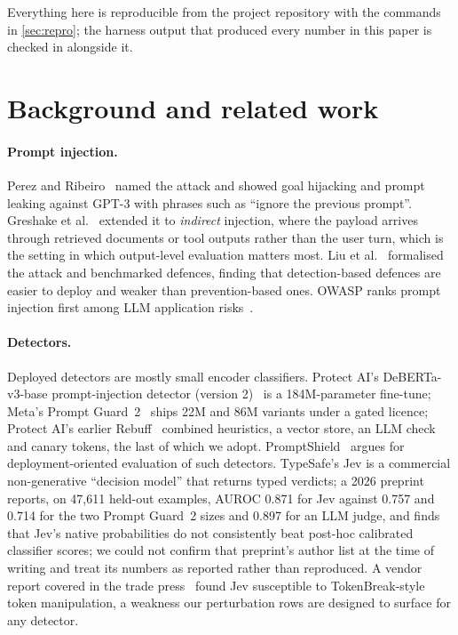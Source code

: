 \documentclass[10pt,a4paper]{article}
\begin{document}
Everything here is reproducible from the project repository with the commands in \cref{sec:repro}; the harness output that produced every number in this paper is checked in alongside it.

\section{Background and related work}
\label{sec:related}

\paragraph{Prompt injection.} Perez and Ribeiro~\cite{perez2022ignore} named the attack and showed goal hijacking and prompt leaking against GPT-3 with phrases such as ``ignore the previous prompt''. Greshake et al.~\cite{greshake2023indirect} extended it to \emph{indirect} injection, where the payload arrives through retrieved documents or tool outputs rather than the user turn, which is the setting in which output-level evaluation matters most. Liu et al.~\cite{liu2024formalizing} formalised the attack and benchmarked defences, finding that detection-based defences are easier to deploy and weaker than prevention-based ones. OWASP ranks prompt injection first among LLM application risks~\cite{owasp2025llm01}.

\paragraph{Detectors.} Deployed detectors are mostly small encoder classifiers. Protect AI's DeBERTa-v3-base prompt-injection detector (version 2)~\cite{protectai2024deberta} is a 184M-parameter fine-tune; Meta's Prompt Guard~2~\cite{meta2025promptguard2} ships 22M and 86M variants under a gated licence; Protect AI's earlier Rebuff~\cite{protectai2023rebuff} combined heuristics, a vector store, an LLM check and canary tokens, the last of which we adopt. PromptShield~\cite{jacob2025promptshield} argues for deployment-oriented evaluation of such detectors. TypeSafe's Jev is a commercial non-generative ``decision model'' that returns typed verdicts; a 2026 preprint~\cite{calibration2026deferral} reports, on 47{,}611 held-out examples, AUROC 0.871 for Jev against 0.757 and 0.714 for the two Prompt Guard~2 sizes and 0.897 for an LLM judge, and finds that Jev's native probabilities do not consistently beat post-hoc calibrated classifier scores; we could not confirm that preprint's author list at the time of writing and treat its numbers as reported rather than reproduced. A vendor report covered in the trade press~\cite{schuman2026jev} found Jev susceptible to TokenBreak-style token manipulation, a weakness our perturbation rows are designed to surface for any detector.
\end{document}
